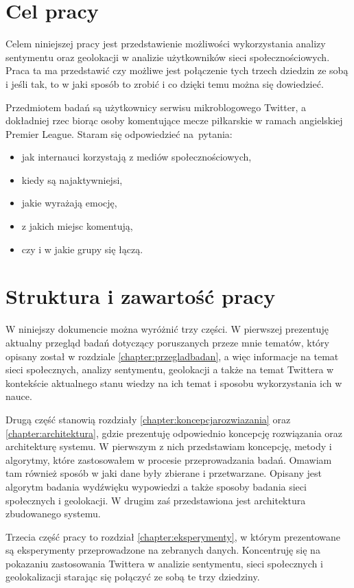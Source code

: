 \section{Cel pracy}
Celem niniejszej pracy jest przedstawienie możliwości wykorzystania
analizy sentymentu oraz geolokacji w analizie użytkowników sieci
społecznościowych. Praca ta ma przedstawić czy możliwe jest połączenie tych
trzech dziedzin ze sobą i jeśli tak, to w jaki sposób to zrobić i co dzięki
temu można się dowiedzieć.

Przedmiotem badań są użytkownicy serwisu mikroblogowego Twitter, a dokładniej
rzec biorąc osoby komentujące mecze piłkarskie w ramach angielskiej Premier
League.
Staram się odpowiedzieć na~pytania:
\begin{itemize}
  \item jak internauci korzystają z mediów społecznościowych,
  \item kiedy są najaktywniejsi,
  \item jakie wyrażają emocję,
  \item z jakich miejsc komentują,
  \item czy i w jakie grupy się łączą.
\end{itemize}

\section{Struktura i zawartość pracy}
W niniejszy dokumencie można wyróżnić trzy części. W pierwszej prezentuję
aktualny przegląd badań dotyczący poruszanych przeze mnie tematów, który
opisany został w rozdziale \ref{chapter:przegladbadan}, a więc 
informacje na temat sieci społecznych, analizy sentymentu, geolokacji
a także na temat Twittera w kontekście aktualnego stanu wiedzy na ich temat i
sposobu wykorzystania ich w nauce.

Drugą część stanowią rozdziały \ref{chapter:koncepcjarozwiazania} oraz
\ref{chapter:architektura}, gdzie prezentuję odpowiednio koncepcję rozwiązania
oraz architekturę systemu. W pierwszym z nich przedstawiam koncepcję, metody i
algorytmy, które zastosowałem w procesie przeprowadzania badań. Omawiam tam
również sposób w jaki dane były zbierane i przetwarzane. Opisany jest algorytm
badania wydźwięku wypowiedzi a także sposoby badania sieci społecznych i
geolokacji. W drugim zaś przedstawiona jest architektura zbudowanego systemu.

Trzecia część pracy to rozdział \ref{chapter:eksperymenty}, w którym
prezentowane są eksperymenty przeprowadzone na zebranych danych.
Koncentruję się na pokazaniu zastosowania Twittera w analizie
sentymentu, sieci społecznych i geolokalizacji starając się połączyć
ze sobą te trzy dziedziny.


